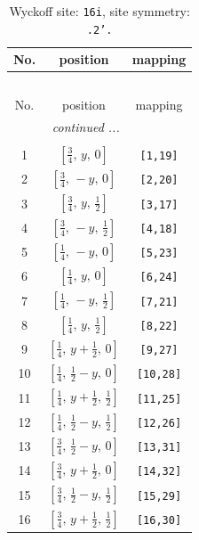 \documentclass[fleqn,8pt]{jsarticle}
\begin{document}
\renewcommand{\arraystretch}{1.2}
\begin{longtable}{ccc}
\caption{Wyckoff site: {\tt 16i}, site symmetry: {\tt .2'.}}
 \\
 \hline \hline
No. & position & mapping \\ \hline \endfirsthead

\multicolumn{2}{l}{\tablename\ \thetable{}} \\
 \hline \hline
No. & position & mapping \\ \hline \endhead

 \hline \hline
\multicolumn{2}{r}{\footnotesize\it continued ...} \\ \endfoot

 \hline \hline
\multicolumn{2}{r}{} \\ \endlastfoot

1 & $\left[ \frac{3}{4},\, y,\, 0 \right]$ & {\tt [1,19]} \\ \hline
2 & $\left[ \frac{3}{4},\, - y,\, 0 \right]$ & {\tt [2,20]} \\ \hline
3 & $\left[ \frac{3}{4},\, y,\, \frac{1}{2} \right]$ & {\tt [3,17]} \\ \hline
4 & $\left[ \frac{3}{4},\, - y,\, \frac{1}{2} \right]$ & {\tt [4,18]} \\ \hline
5 & $\left[ \frac{1}{4},\, - y,\, 0 \right]$ & {\tt [5,23]} \\ \hline
6 & $\left[ \frac{1}{4},\, y,\, 0 \right]$ & {\tt [6,24]} \\ \hline
7 & $\left[ \frac{1}{4},\, - y,\, \frac{1}{2} \right]$ & {\tt [7,21]} \\ \hline
8 & $\left[ \frac{1}{4},\, y,\, \frac{1}{2} \right]$ & {\tt [8,22]} \\ \hline
9 & $\left[ \frac{1}{4},\, y + \frac{1}{2},\, 0 \right]$ & {\tt [9,27]} \\ \hline
10 & $\left[ \frac{1}{4},\, \frac{1}{2} - y,\, 0 \right]$ & {\tt [10,28]} \\ \hline
11 & $\left[ \frac{1}{4},\, y + \frac{1}{2},\, \frac{1}{2} \right]$ & {\tt [11,25]} \\ \hline
12 & $\left[ \frac{1}{4},\, \frac{1}{2} - y,\, \frac{1}{2} \right]$ & {\tt [12,26]} \\ \hline
13 & $\left[ \frac{3}{4},\, \frac{1}{2} - y,\, 0 \right]$ & {\tt [13,31]} \\ \hline
14 & $\left[ \frac{3}{4},\, y + \frac{1}{2},\, 0 \right]$ & {\tt [14,32]} \\ \hline
15 & $\left[ \frac{3}{4},\, \frac{1}{2} - y,\, \frac{1}{2} \right]$ & {\tt [15,29]} \\ \hline
16 & $\left[ \frac{3}{4},\, y + \frac{1}{2},\, \frac{1}{2} \right]$ & {\tt [16,30]} \\
\end{longtable}
\end{document}
